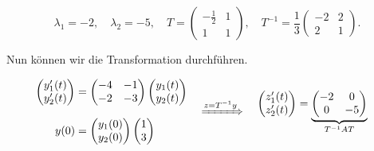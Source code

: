 \begin{equation*}
    \lambda_1 = -2, \quad \lambda_2 = -5, \quad T = \begin{pmatrix}
        -\frac{1}{2} & 1 \\
        1 & 1
    \end{pmatrix}, \quad T^{-1} = \frac{1}{3} \begin{pmatrix}
        -2 & 2 \\
        2 & 1
    \end{pmatrix}.
\end{equation*}

Nun können wir die Transformation durchführen. 

\begin{equation*}
        \begin{aligned}
            \begin{pmatrix}
                y_1'(t) \\
                y_2'(t)
            \end{pmatrix} &=
            \begin{pmatrix}
                -4 & -1 \\
                -2 & -3
            \end{pmatrix}
            \begin{pmatrix}
                y_1(t) \\
                y_2(t)
            \end{pmatrix} \\[0.75em]
            y(0)&= \begin{pmatrix}
                y_1(0) \\
                y_2(0)
            \end{pmatrix}
            \begin{pmatrix}
                1 \\
                3
            \end{pmatrix} 
        \end{aligned} \quad \xRightarrow{z = T^{-1}y} \quad
        \begin{aligned}
            \begin{pmatrix}
                z_1'(t) \\
                z_2'(t)
            \end{pmatrix} &=
            \underbrace{\begin{pmatrix}
                -2 & 0 \\
                0 & -5
            \end{pmatrix}}_{T^{-1} A T}

\end{aligned}
\end{equation*}
